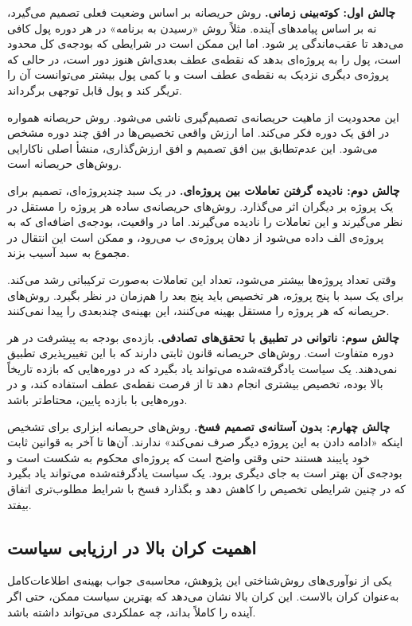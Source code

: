 \textbf{چالش اول: کوته‌بینی زمانی.} روش حریصانه بر اساس وضعیت
فعلی تصمیم می‌گیرد، نه بر اساس پیامدهای آینده. مثلاً روش
«رسیدن به برنامه» در هر دوره پول کافی می‌دهد تا عقب‌ماندگی پر
شود. اما این ممکن است در شرایطی که بودجه‌ی کل محدود است، پول
را به پروژه‌ای بدهد که نقطه‌ی عطف بعدی‌اش هنوز دور است، در حالی
که پروژه‌ی دیگری نزدیک به نقطه‌ی عطف است و با کمی پول بیشتر
می‌توانست آن را تریگر کند و پول قابل توجهی برگرداند.

این محدودیت از ماهیت حریصانه‌ی تصمیم‌گیری ناشی می‌شود. روش
حریصانه همواره در افق یک دوره فکر می‌کند. اما ارزش واقعی
تخصیص‌ها در افق چند دوره مشخص می‌شود. این عدم‌تطابق بین
افق تصمیم و افق ارزش‌گذاری، منشأ اصلی ناکارایی روش‌های حریصانه است.

\textbf{چالش دوم: نادیده گرفتن تعاملات بین پروژه‌ای.} در یک سبد
چندپروژه‌ای، تصمیم برای یک پروژه بر دیگران اثر می‌گذارد. روش‌های
حریصانه‌ی ساده هر پروژه را مستقل در نظر می‌گیرند و این تعاملات
را نادیده می‌گیرند. اما در واقعیت، بودجه‌ی اضافه‌ای که به
پروژه‌ی الف داده می‌شود از دهان پروژه‌ی ب می‌رود، و ممکن است
این انتقال در مجموع به سبد آسیب بزند.

وقتی تعداد پروژه‌ها بیشتر می‌شود، تعداد این تعاملات به‌صورت
ترکیباتی رشد می‌کند. برای یک سبد با پنج پروژه، هر تخصیص باید
پنج بعد را هم‌زمان در نظر بگیرد. روش‌های حریصانه که هر پروژه را
مستقل بهینه می‌کنند، این بهینه‌ی چندبعدی را پیدا نمی‌کنند.

\textbf{چالش سوم: ناتوانی در تطبیق با تحقق‌های تصادفی.} بازده‌ی
بودجه به پیشرفت در هر دوره متفاوت است. روش‌های حریصانه قانون
ثابتی دارند که با این تغییرپذیری تطبیق نمی‌دهند. یک سیاست یادگرفته‌شده
می‌تواند یاد بگیرد که در دوره‌هایی که بازده تاریخاً بالا بوده،
تخصیص بیشتری انجام دهد تا از فرصت نقطه‌ی عطف استفاده کند، و
در دوره‌هایی با بازده پایین، محتاط‌تر باشد.

\textbf{چالش چهارم: بدون آستانه‌ی تصمیم فسخ.} روش‌های حریصانه
ابزاری برای تشخیص اینکه «ادامه دادن به این پروژه دیگر صرف
نمی‌کند» ندارند. آن‌ها تا آخر به قوانین ثابت خود پایبند هستند
حتی وقتی واضح است که پروژه‌ای محکوم به شکست است و بودجه‌ی آن
بهتر است به جای دیگری برود. یک سیاست یادگرفته‌شده می‌تواند یاد
بگیرد که در چنین شرایطی تخصیص را کاهش دهد و بگذارد فسخ با
شرایط مطلوب‌تری اتفاق بیفتد.

\subsection{اهمیت کران بالا در ارزیابی سیاست}
\label{subsec:upper_bound_importance}

یکی از نوآوری‌های روش‌شناختی این پژوهش، محاسبه‌ی جواب بهینه‌ی
اطلاعات‌کامل به‌عنوان کران بالاست. این کران بالا نشان می‌دهد که
بهترین سیاست ممکن، حتی اگر آینده را کاملاً بداند، چه عملکردی
می‌تواند داشته باشد.

